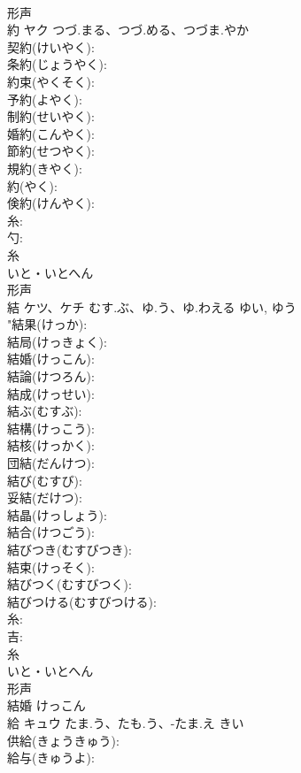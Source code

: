 \documentclass[8pt]{extreport}
\begin{document}
\begin{CJK}{UTF8}{min}
\\	形声 
\\	約	ヤク	つづ.まる、つづ.める、つづま.やか		
\\	契約(けいやく): 
\\	条約(じょうやく): 
\\	約束(やくそく): 
\\	予約(よやく): 
\\	制約(せいやく): 
\\	婚約(こんやく): 
\\	節約(せつやく): 
\\	規約(きやく): 
\\	約(やく): 
\\	倹約(けんやく): 
\\	糸: 
\\	勺: 
\\	糸	
\\	いと・いとへん	
\\	形声 
\\	結	ケツ、ケチ	むす.ぶ、ゆ.う、ゆ.わえる	ゆい, ゆう	
\\	"結果(けっか): 
\\	結局(けっきょく): 
\\	結婚(けっこん): 
\\	結論(けつろん): 
\\	結成(けっせい): 
\\	結ぶ(むすぶ): 
\\	結構(けっこう): 
\\	結核(けっかく): 
\\	団結(だんけつ): 
\\	結び(むすび): 
\\	妥結(だけつ): 
\\	結晶(けっしょう): 
\\	結合(けつごう): 
\\	結びつき(むすびつき): 
\\	結束(けっそく): 
\\	結びつく(むすびつく): 
\\	結びつける(むすびつける): 
\\	糸: 
\\	吉: 
\\	糸	
\\	いと・いとへん	
\\	形声 
\\	結婚 けっこん 
\\	給	キュウ	たま.う、たも.う、-たま.え	きい	
\\	供給(きょうきゅう): 
\\	給与(きゅうよ): 

\end{CJK}
\end{document}
